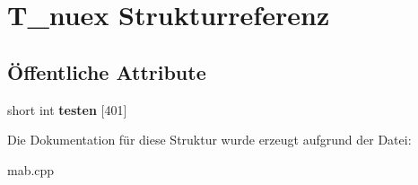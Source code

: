 \hypertarget{structT__nuex}{\section{T\-\_\-nuex Strukturreferenz}
\label{structT__nuex}
}
\subsection*{Öffentliche Attribute}
\begin{DoxyCompactItemize}
\item 
\hypertarget{structT__nuex_a9b27fdca5f3fb081e5880a1e5c258638}{short int {\bfseries testen} \mbox{[}401\mbox{]}}\label{structT__nuex_a9b27fdca5f3fb081e5880a1e5c258638}

\end{DoxyCompactItemize}


Die Dokumentation für diese Struktur wurde erzeugt aufgrund der Datei\-:\begin{DoxyCompactItemize}
\item 
mab.\-cpp\end{DoxyCompactItemize}
